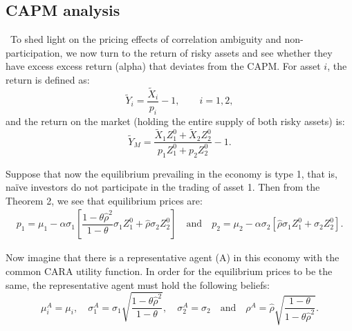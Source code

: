 \documentclass[10pt]{article}
\begin{document}
\subsection{CAPM analysis}

\quad \ 
To shed light on the pricing effects of correlation ambiguity and non-participation, we now turn to the return of risky assets and see whether they have excess excess return (alpha) that deviates from the CAPM. For asset $i$, the return is defined as:
\begin{equation*}
\tilde{Y}_i = \dfrac{\tilde{X}_i}{p_i} - 1, \qquad i = 1, 2,
\end{equation*}
and the return on the market (holding the entire supply of both risky assets) is:
\begin{equation*}
\tilde{Y}_M = \dfrac{\tilde{X}_1 Z_1^0 + \tilde{X}_2 Z_2^0}{p_1 Z_1^0 + p_2 Z_2^0} - 1. 
\end{equation*}

Suppose that now the equilibrium prevailing in the economy is type 1, that is, na\"ive investors do not participate in the trading of asset 1. Then from the Theorem 2, we see that equilibrium prices are:
\begin{eqnarray*}
p_1 = \mu_1 - \alpha \sigma_1 \left[ \dfrac{1 - \theta {\hat \rho}^2}{1 - \theta} \sigma_1 Z_1^0 + {\hat \rho} \sigma_2 Z_2^0 \right] \quad \text{and} \quad p_2 = \mu_2 - \alpha \sigma_2 \left[ {\hat \rho} \sigma_1 Z_1^0 + \sigma_2 Z_2^0 \right].
\end{eqnarray*}

Now imagine that there is a representative agent (A) in this economy with the common CARA utility function. In order for the equilibrium prices to be the same, the representative agent must hold the following beliefs: 
\begin{equation*}
\mu_i^A = \mu_i, \quad \sigma_1^A = \sigma_1 \sqrt{\dfrac{1 - \theta \hat{\rho}^2}{1 - \theta}}, \quad \sigma_2^A = \sigma_2 \quad \text{and} \quad \rho^A = \hat{\rho} \sqrt{\dfrac{1 - \theta}{1 - \theta \hat{\rho}^2}}. 
\end{equation*}
\end{document}
